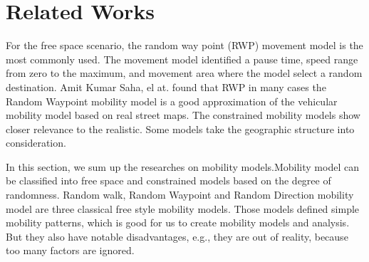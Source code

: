 \section{Related Works}
\label{section_related_works}

For the free space scenario, the random way point (RWP)\cite{broch1998performance} movement model is the most commonly used. The movement model identified a pause time, speed range from zero to the maximum, and movement area where the model select a random destination. Amit Kumar Saha, el at. \cite{SahaJohnson-91} found that RWP in many cases the Random Waypoint mobility model is a good approximation of the vehicular mobility model based on real street maps.
The constrained mobility models show closer relevance to the realistic. Some models \cite{HuangZhu-88,SahaJohnson-91,MartinezCano-87,ChoffnesBustamante-93} take the geographic structure into consideration. 

In this section,  we sum up the researches on mobility models.Mobility model can be classified into free space and constrained models\cite{LuChen-104,AhmedKarmakar-106} based on the degree of randomness.
Random walk, Random Waypoint and Random Direction mobility model are three classical free style mobility models. Those models defined simple mobility patterns, which is good for us to create mobility models and analysis. But they also have notable disadvantages, e.g., they  are out of reality, because too many factors are ignored. 


